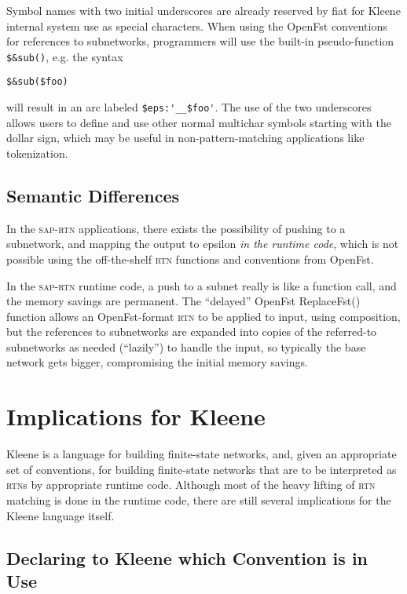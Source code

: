 \documentclass[letterpaper,12pt]{article}
\providecommand{\acro}{}\renewcommand{\acro}{\textsc}
\begin{document}
Symbol names with two initial underscores are already reserved by fiat for Kleene internal system
use as special characters.  When using the OpenFst conventions for references to
subnetworks, programmers will use the built-in pseudo-function \verb!$&sub()!, e.g.\@
the syntax

\begin{Verbatim}[fontsize=\small]
$&sub($foo)
\end{Verbatim}

\noindent
will result in an arc labeled \verb!$eps:'__$foo'!.  The use of the two underscores
allows users to define and use other normal multichar symbols starting with the dollar sign, which
may be useful in non-pattern-matching applications like tokenization.

\subsection{Semantic Differences}

In the \acro{sap-rtn} applications, there exists the possibility of pushing to a
subnetwork, and mapping the output to epsilon \emph{in the runtime code}, which is not possible using the
off-the-shelf \acro{rtn} functions and conventions from OpenFst.

In the \acro{sap-rtn} runtime code, a push to a subnet really is like a function
call, and the memory savings are permanent.  The ``delayed'' OpenFst ReplaceFst()
function allows an OpenFst-format \acro{rtn} to be applied to input, using
composition, but the references to subnetworks are expanded into copies of the
referred-to subnetworks as needed (``lazily'') 
to handle the input, so typically the base network gets bigger, compromising the initial
memory savings.

\section{Implications for Kleene}

Kleene is a language for building finite-state networks, and, given an appropriate
set of conventions, for building finite-state networks that are to be interpreted as \acro{rtn}s
by appropriate runtime code.  Although most of the heavy lifting of \acro{rtn}
matching is done in the runtime code, there are still several implications for the Kleene
language
itself.

\subsection{Declaring to Kleene which Convention is in Use}
\end{document}
